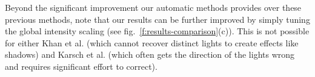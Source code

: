 Beyond the significant improvement our automatic methods provides over these previous methods, note that our results can be further improved by simply tuning the global intensity scaling (see fig.~\ref{f:results-comparison}(c)). This is not possible for either Khan et al. (which cannot recover distinct lights to create effects like shadows) and Karsch et al. (which often gets the direction of the lights wrong and requires significant effort to correct).







